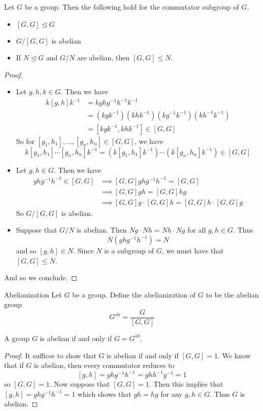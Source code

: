\documentclass[a4paper]{article}
\begin{document}
\begin{prp}{}{} Let $G$ be a group. Then the following hold for the commutator subgroup of $G$. 
\begin{itemize}
\item $[G,G]\trianglelefteq G$
\item $G/[G,G]$ is abelian
\item If $N\trianglelefteq G$ and $G/N$ are abelian, then $[G,G]\leq N$. 
\end{itemize} \tcbline
\begin{proof}~\\
\begin{itemize}
\item Let $g,h,k\in G$. Then we have 
\begin{align*}
k[g,h]k^{-1}&=kghg^{-1}h^{-1}k^{-1}\\
&=\left(kgk^{-1}\right)\left(khk^{-1}\right)\left(kg^{-1}k^{-1}\right)\left(kh^{-1}k^{-1}\right)\\
&=[kgk^{-1},khk^{-1}]\in[G,G]
\end{align*}
So for $[g_1,h_1],\dots,[g_n,h_n]\in[G,G]$, we have $$k[g_1,h_1]\cdots[g_n,h_n]k^{-1}=\left(k[g_1,h_1]k^{-1}\right)\cdots\left(k[g_n,h_n]k^{-1}\right)\in[G,G]$$
\item Let $g,h\in G$. Then we have 
\begin{align*}
ghg^{-1}h^{-1}\in[G,G]&\implies [G,G]ghg^{-1}h^{-1}=[G,G]\\
&\implies [G,G]gh=[G,G]hg\\
&\implies [G,G]g\cdot[G,G]h=[G,G]h\cdot[G,G]g
\end{align*}
So $G/[G,G]$ is abelian. 
\item Suppose that $G/N$ is abelian. Then $Ng\cdot Nh=Nh\cdot Ng$ for all $g,h\in G$. Thus $$N(ghg^{-1}h^{-1})=N$$ and so $[g,h]\in N$. Since $N$ is a subgroup of $G$, we must have that $[G,G]\leq N$. 
\end{itemize}
And so we conclude. 
\end{proof}
\end{prp}

\begin{defn}{Abelianization}{} Let $G$ be a group. Define the abelianization of $G$ to be the abelian group $$G^\text{ab}=\frac{G}{[G,G]}$$
\end{defn}

\begin{prp}{}{} A group $G$ is abelian if and only if $G=G^\text{ab}$. \tcbline
\begin{proof}
It suffices to show that $G$ is abelian if and only if $[G,G]=1$. We know that if $G$ is abelian, then every commutator reduces to $$[g,h]=ghg^{-1}h^{-1}=ghh^{-1}g^{-1}=1$$ so $[G,G]=1$. Now suppose that $[G,G]=1$. Then this implies that $[g,h]=ghg^{-1}h^{-1}=1$ which shows that $gh=hg$ for any $g,h\in G$. Thus $G$ is abelian. 
\end{proof}
\end{prp}
\end{document}
